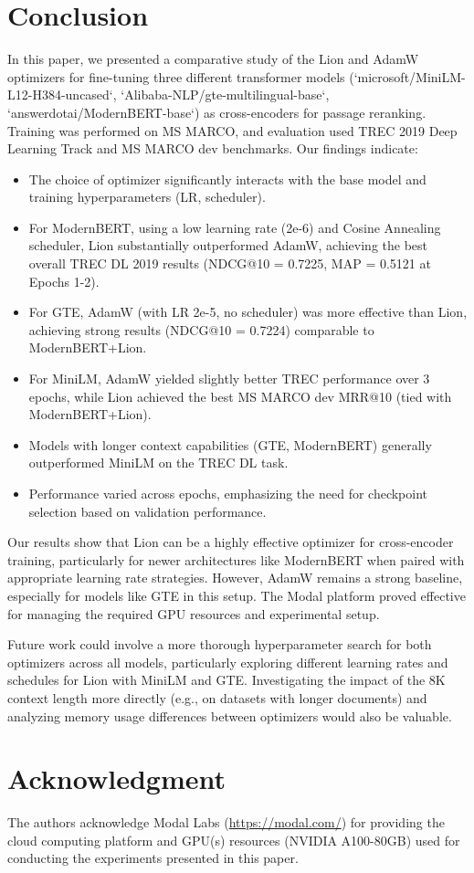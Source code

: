 \documentclass[conference]{IEEEtran}
\begin{document}
\section{Conclusion}
\label{sec:conclusion}
In this paper, we presented a comparative study of the Lion and AdamW optimizers for fine-tuning three different transformer models (`microsoft/MiniLM-L12-H384-uncased`, `Alibaba-NLP/gte-multilingual-base`, `answerdotai/ModernBERT-base`) as cross-encoders for passage reranking. Training was performed on MS MARCO, and evaluation used TREC 2019 Deep Learning Track and MS MARCO dev benchmarks. Our findings indicate:
\begin{itemize}
    \item The choice of optimizer significantly interacts with the base model and training hyperparameters (LR, scheduler).
    \item For ModernBERT, using a low learning rate (2e-6) and Cosine Annealing scheduler, Lion substantially outperformed AdamW, achieving the best overall TREC DL 2019 results (NDCG@10 = 0.7225, MAP = 0.5121 at Epochs 1-2).
    \item For GTE, AdamW (with LR 2e-5, no scheduler) was more effective than Lion, achieving strong results (NDCG@10 = 0.7224) comparable to ModernBERT+Lion.
    \item For MiniLM, AdamW yielded slightly better TREC performance over 3 epochs, while Lion achieved the best MS MARCO dev MRR@10 (tied with ModernBERT+Lion).
    \item Models with longer context capabilities (GTE, ModernBERT) generally outperformed MiniLM on the TREC DL task.
    \item Performance varied across epochs, emphasizing the need for checkpoint selection based on validation performance.
\end{itemize}
Our results show that Lion can be a highly effective optimizer for cross-encoder training, particularly for newer architectures like ModernBERT when paired with appropriate learning rate strategies. However, AdamW remains a strong baseline, especially for models like GTE in this setup. The Modal platform proved effective for managing the required GPU resources and experimental setup.

Future work could involve a more thorough hyperparameter search for both optimizers across all models, particularly exploring different learning rates and schedules for Lion with MiniLM and GTE. Investigating the impact of the 8K context length more directly (e.g., on datasets with longer documents) and analyzing memory usage differences between optimizers would also be valuable.

\section*{Acknowledgment}
The authors acknowledge Modal Labs (\url{https://modal.com/}) for providing the cloud computing platform and GPU(s) resources (NVIDIA A100-80GB) used for conducting the experiments presented in this paper.


 
\end{document}
